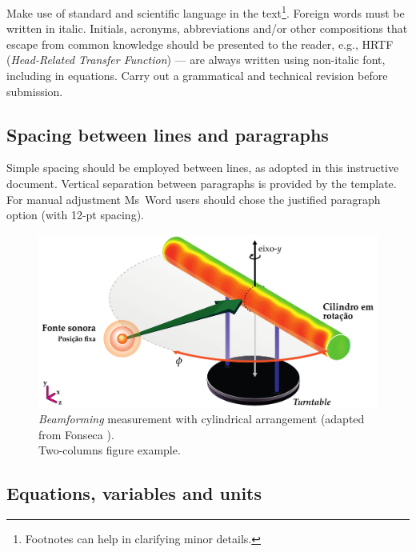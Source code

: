 \documentclass[12pt, a4paper, twoside, twocolumn]{article}
\begin{document}
Make use of standard and scientific language in the text\footnote{Footnotes can help in clarifying minor details.}. Foreign words must be written in italic. Initials, acronyms, abbreviations and/or other compositions that escape from common knowledge should be presented to the reader, e.g., HRTF (\textit{Head-Related Transfer Function}) --- are always written using non-italic font, including in equations. Carry out a grammatical and technical revision before submission.

\subsection{Spacing between lines and paragraphs}

Simple spacing should be employed between lines, as adopted in this instructive document. Vertical separation between paragraphs is provided by the template. For manual adjustment Ms~Word users should chose the justified paragraph option (with 12-pt spacing).


\begin{figure}[!ht] %
	\centering
	\includegraphics[width=0.74\linewidth]{figs/Measurement-Scheme-Fonseca-2013.pdf}%
	\caption{\textit{Beamforming} measurement with cylindrical arrangement (adapted from Fonseca \cite{Fonseca-2013}).\\ Two-columns figure example.}%
	\label{fig:beamforming}%
\end{figure}

\subsection{Equations, variables and units}
\end{document}
